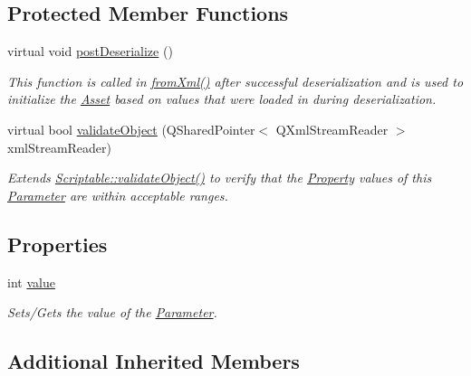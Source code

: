 \subsection*{Protected Member Functions}
\begin{DoxyCompactItemize}
\item 
virtual void \hyperlink{class_picto_1_1_numeric_parameter_a4fc2328b188b54a0f4a075878c288144}{post\-Deserialize} ()
\begin{DoxyCompactList}\small\item\em This function is called in \hyperlink{class_picto_1_1_asset_a8bed4da09ecb1c07ce0dab313a9aba67}{from\-Xml()} after successful deserialization and is used to initialize the \hyperlink{class_picto_1_1_asset}{Asset} based on values that were loaded in during deserialization. \end{DoxyCompactList}\item 
virtual bool \hyperlink{class_picto_1_1_numeric_parameter_a5521077980f558300f920f39d7be7eed}{validate\-Object} (Q\-Shared\-Pointer$<$ Q\-Xml\-Stream\-Reader $>$ xml\-Stream\-Reader)
\begin{DoxyCompactList}\small\item\em Extends \hyperlink{class_picto_1_1_scriptable_ab6e2944c43a3b5d418bf7b251594386d}{Scriptable\-::validate\-Object()} to verify that the \hyperlink{class_picto_1_1_property}{Property} values of this \hyperlink{class_picto_1_1_parameter}{Parameter} are within acceptable ranges. \end{DoxyCompactList}\end{DoxyCompactItemize}
\subsection*{Properties}
\begin{DoxyCompactItemize}
\item 
\hypertarget{class_picto_1_1_numeric_parameter_a706ada3659ed52a0d262607197fbf072}{int \hyperlink{class_picto_1_1_numeric_parameter_a706ada3659ed52a0d262607197fbf072}{value}}\label{class_picto_1_1_numeric_parameter_a706ada3659ed52a0d262607197fbf072}

\begin{DoxyCompactList}\small\item\em Sets/\-Gets the value of the \hyperlink{class_picto_1_1_parameter}{Parameter}. \end{DoxyCompactList}\end{DoxyCompactItemize}
\subsection*{Additional Inherited Members}


